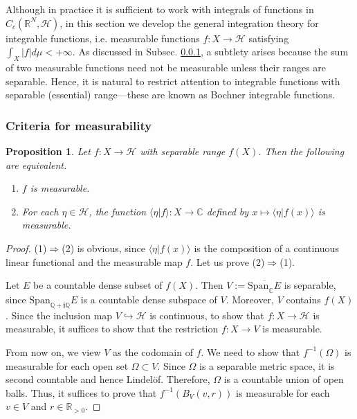 \documentclass[12pt,b5paper,notitlepage]{article}
\theoremstyle{definition}
\theoremstyle{plain}
\newtheorem{pp}[df]{Proposition}
\newcommand{\ovl}{\overline}
\newcommand{\Span}{\mathrm{Span}}
\newcommand{\bk}[1]{\langle {#1}\rangle}
\newcommand{\im}{\mathbf{i}}
\newcommand{\Cbb}{\mathbb C}
\newcommand{\Qbb}{\mathbb Q}
\newcommand{\Rbb}{\mathbb R}
\newcommand{\MH}{\mathcal H}
\numberwithin{equation}{section}
\begin{document}
\begin{subappendices}
Although in practice it is sufficient to work with integrals of functions in $C_c(\Rbb^N,\MH)$, in this section we develop the general integration theory for integrable functions, i.e. measurable functions $f:X\rightarrow\MH$ satisfying $\int_X|f|d\mu<+\infty$. As discussed in Subsec. \ref{lb529}, a subtlety arises because the sum of two measurable functions need not be measurable unless their ranges are separable.
Hence, it is natural to restrict attention to integrable functions with separable (essential) range---these are known as Bochner integrable functions.











\subsubsection{Criteria for measurability}\label{lb529}







\begin{pp}\label{lb491}
Let $f:X\rightarrow \MH$ with separable range $f(X)$. Then the following are equivalent.
\begin{enumerate}
\item[(1)] $f$ is measurable. 
\item[(2)] For each $\eta\in \MH$, the function $\bk{\eta|f}:X\rightarrow\Cbb$ defined by $x\mapsto \bk{\eta|f(x)}$ is measurable.
\end{enumerate}
\end{pp}




\begin{proof}
(1)$\Rightarrow$(2) is obvious, since $\bk{\eta|f(x)}$ is the composition of a continuous linear functional and the measurable map $f$. Let us prove (2)$\Rightarrow$(1).

Let $E$ be a countable dense subset of $f(X)$. Then $V:=\ovl{\Span_\Cbb E}$ is separable, since $\Span_{\Qbb+\im\Qbb}E$ is a countable dense subspace of $V$. Moreover, $V$ contains $f(X)$. Since the inclusion map $V\hookrightarrow \MH$ is continuous, to show that $f:X\rightarrow \MH$ is measurable, it suffices to show that the restriction $f:X\rightarrow V$ is measurable.

From now on, we view $V$ as the codomain of $f$. We need to show that $f^{-1}(\Omega)$ is measurable for each open set $\Omega\subset V$. Since $\Omega$ is a separable metric space, it is second countable and hence Lindel\"of. Therefore, $\Omega$ is a countable union of open balls. Thus, it suffices to prove that $f^{-1}(B_V(v,r))$ is measurable for each $v\in V$ and $r\in\Rbb_{>0}$.


\end{proof}
\end{subappendices}
\end{document}
